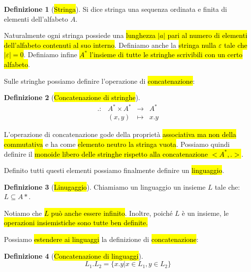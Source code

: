 \documentclass[a4paper,11pt,oneside]{article}
\theoremstyle{plain}
\theoremstyle{definition}
\newtheorem{defn}{Definizione}[section]
\theoremstyle{remark}
\begin{document}
\begin{defn}[\hl{Stringa}]\label{def:stringa}
  Si dice stringa una sequenza ordinata e finita di elementi dell'alfabeto $A$.
\end{defn}

Naturalmente ogni stringa possiede una \hl{lunghezza $|a|$ pari al numero di
elementi dell'alfabeto contenuti al suo interno}. Definiamo anche la \hl{stringa
nulla $\varepsilon$ tale che $|\varepsilon|=0$}. Definiamo infine \hl{$A^*$
l'insieme di tutte le stringhe scrivibili con un certo alfabeto}.

Sulle stringhe possiamo definire l'operazione di \hl{concatenazione}:

\begin{defn}[\hl{Concatenazione di stringhe}]\label{def:concatenazione-stringhe}
  \[
    \begin{array}{cccc}
      . : & A^* \times A^* & \to & A^* \\
          & (x, y) & \mapsto & x.y
    \end{array}
  \]
\end{defn}

L'operazione di concatenazione gode della proprietà \hl{associativa ma non della
commutativa} e ha come \hl{elemento neutro la stringa vuota}. Possiamo quindi
definire il \hl{monoide libero delle stringhe rispetto alla concatenazione
$<A^*, .>$}.

Definito tutti questi elementi possiamo finalmente definire un \hl{linguaggio}.

\begin{defn}[\hl{Linugaggio}]\label{def:linguaggio}
  Chiamiamo un linguaggio un insieme $L$ tale che: $L \subseteq A*$.
\end{defn}

Notiamo che \hl{$L$ può anche essere infinito}. Inoltre, poiché $L$ è un
insieme, le \hl{operazioni insiemistiche sono tutte ben definite.}

Possiamo \hl{estendere ai linguaggi} la definizione di \hl{concatenazione}:

\begin{defn}[\hl{Concatenazione di linguaggi}]\label{def:concatenazione-ling}
  \[
    L_1 . L_2 = \{ x.y | x \in L_1, y \in L_2 \}
  \]
\end{defn}
\end{document}
